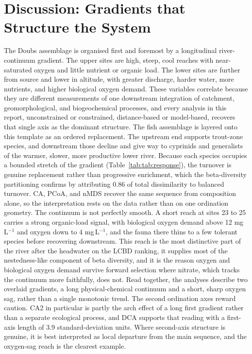 \documentclass[11pt]{article}
\begin{document}
\section{Discussion: Gradients that Structure the System}
The Doubs assemblage is organised first and foremost by a longitudinal river-continuum gradient. The upper sites are high, steep, cool reaches with near-saturated oxygen and little nutrient or organic load. The lower sites are further from source and lower in altitude, with greater discharge, harder water, more nutrients, and higher biological oxygen demand. These variables correlate because they are different measurements of one downstream integration of catchment, geomorphological, and biogeochemical processes, and every analysis in this report, unconstrained or constrained, distance-based or model-based, recovers that single axis as the dominant structure.
The fish assemblage is layered onto this template as an ordered replacement. The upstream end supports trout-zone species, and downstream those decline and give way to cyprinids and generalists of the warmer, slower, more productive lower river. Because each species occupies a bounded stretch of the gradient (Table~\ref{tab:tab:response}), the turnover is genuine replacement rather than progressive enrichment, which the beta-diversity partitioning confirms by attributing 0.86 of total dissimilarity to balanced turnover. CA, PCoA, and nMDS recover the same sequence from composition alone, so the interpretation rests on the data rather than on one ordination geometry.
The continuum is not perfectly smooth. A short reach at sites 23 to 25 carries a strong organic-load signal, with biological oxygen demand above 12 mg\,L$^{-1}$ and oxygen down to 4 mg\,L$^{-1}$, and the fauna there thins to a few tolerant species before recovering downstream. This reach is the most distinctive part of the river after the headwater on the LCBD ranking, it supplies most of the nestedness-like component of beta diversity, and it is the reason oxygen and biological oxygen demand survive forward selection where nitrate, which tracks the continuum more faithfully, does not. Read together, the analyses describe two overlaid gradients, a long physical-chemical continuum and a short, sharp oxygen sag, rather than a single monotonic trend.
The second ordination axes reward caution. CA2 in particular is partly the arch effect of a long first gradient rather than a separate ecological process, and DCA supports that reading with a first-axis length of 3.9 standard-deviation units. Where second-axis structure is genuine, it is best interpreted as local departure from the main sequence, and the oxygen-sag reach is the clearest example.
\end{document}
